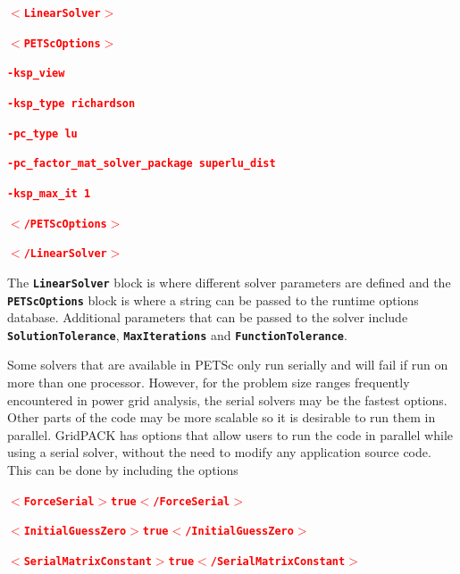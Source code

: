 \documentclass[12pt]{report} %
\begin{document}
\textcolor{red}{\texttt{\textbf{$\boldsymbol{\mathrm{<}}$LinearSolver$\boldsymbol{\mathrm{>}}$}}}

\textcolor{red}{\texttt{\textbf{\;\;$\boldsymbol{\mathrm{<}}$PETScOptions$\boldsymbol{\mathrm{>}}$}}}

\textcolor{red}{\texttt{\textbf{\;\;\;\;-ksp\_view}}}

\textcolor{red}{\texttt{\textbf{\;\;\;\;-ksp\_type richardson}}}

\textcolor{red}{\texttt{\textbf{\;\;\;\;-pc\_type lu}}}

\textcolor{red}{\texttt{\textbf{\;\;\;\;-pc\_factor\_mat\_solver\_package superlu\_dist}}}

\textcolor{red}{\texttt{\textbf{\;\;\;\;-ksp\_max\_it 1}}}

\textcolor{red}{\texttt{\textbf{\;\;$\boldsymbol{\mathrm{<}}$/PETScOptions$\boldsymbol{\mathrm{>}}$}}}

\textcolor{red}{\texttt{\textbf{$\boldsymbol{\mathrm{<}}$/LinearSolver$\boldsymbol{\mathrm{>}}$}}}

The \texttt{\textbf{LinearSolver}} block is where different solver parameters are defined and the \texttt{\textbf{PETScOptions}} block is where a string can be passed to the runtime options database. Additional parameters that can be passed to the solver include \texttt{\textbf{SolutionTolerance}}, \texttt{\textbf{MaxIterations}} and \texttt{\textbf{FunctionTolerance}}. 

Some solvers that are available in PETSc only run serially and will fail if run on more than one processor. However, for the problem size ranges frequently encountered in power grid analysis, the serial solvers may be the fastest options. Other parts of the code may be more scalable so it is desirable to run them in parallel. GridPACK has options that allow users to run the code in parallel while using a serial solver, without the need to modify any application source code. This can be done by including the options

\textcolor{red}{\texttt{\textbf{$\boldsymbol{\mathrm{<}}$ForceSerial$\boldsymbol{\mathrm{>}}$true$\boldsymbol{\mathrm{<}}$/ForceSerial$\boldsymbol{\mathrm{>}}$}}}

\textcolor{red}{\texttt{\textbf{$\boldsymbol{\mathrm{<}}$InitialGuessZero$\boldsymbol{\mathrm{>}}$true$\boldsymbol{\mathrm{<}}$/InitialGuessZero$\boldsymbol{\mathrm{>}}$}}}

\textcolor{red}{\texttt{\textbf{$\boldsymbol{\mathrm{<}}$SerialMatrixConstant$\boldsymbol{\mathrm{>}}$true$\boldsymbol{\mathrm{<}}$/SerialMatrixConstant$\boldsymbol{\mathrm{>}}$}}}
\end{document}
